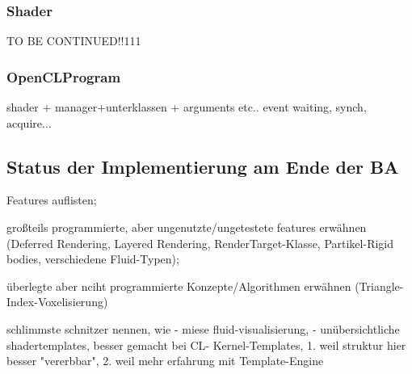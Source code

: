 	\subsubsection{Shader}
		
		TO BE CONTINUED!!111
		
		
	\subsubsection{OpenCLProgram}
		shader + manager+unterklassen + arguments etc.. event waiting, synch, acquire...
		
		\label{sec:CLKernelArguments}





\subsection{Status der Implementierung am Ende der BA}
\label{sec:statusImplementation}
	
	Features auflisten;

	großteils programmierte, aber ungenutzte/ungetestete features erwähnen (Deferred Rendering, Layered Rendering, 	
	RenderTarget-Klasse, Partikel-Rigid bodies, verschiedene Fluid-Typen); 


	überlegte aber nciht programmierte Konzepte/Algorithmen erwähnen (Triangle-Index-Voxelisierung)
	
	schlimmste schnitzer nennen, wie
		- miese fluid-visualisierung, 
		- unübersichtliche shadertemplates, besser gemacht bei CL-
			Kernel-Templates, 1. weil struktur hier besser "vererbbar", 2. weil mehr erfahrung mit  Template-Engine
	
	  	
  	

\clearpage
